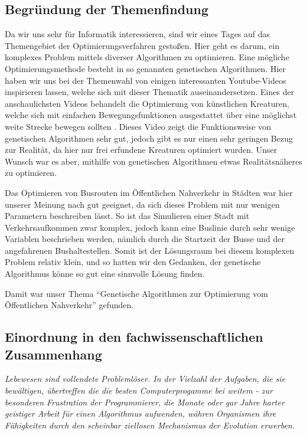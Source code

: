 \documentclass[a4paper, 11pt]{scrartcl}
\begin{document}
\subsection{Begründung der Themenfindung}
Da wir uns sehr für Informatik interessieren, sind wir eines Tages auf das Themengebiet der Optimierungsverfahren gestoßen. Hier geht es darum, ein komplexes Problem mittels diverser Algorithmen zu optimieren. Eine mögliche Optimierungsmethode besteht in so genannten genetischen Algorithmen. Hier haben wir uns bei der Themenwahl von einigen interessanten Youtube-Videos inspirieren lassen, welche sich mit dieser Thematik auseinandersetzen. Eines der anschaulichsten Videos behandelt die Optimierung von künstlichen Kreaturen, welche sich mit einfachen Bewegungsfunktionen ausgestattet über eine möglichst weite Strecke bewegen sollten \cite{carykh2015}. Dieses Video zeigt die Funktionsweise von genetischen Algorithmen sehr gut, jedoch gibt es nur einen sehr geringen Bezug zur Realität, da hier nur frei erfundene Kreaturen optimiert wurden. Unser Wunsch war es aber, mithilfe von genetischen Algorithmen etwas Realitätsnäheres zu optimieren.

Das Optimieren von Busrouten im Öffentlichen Nahverkehr in Städten war hier unserer Meinung nach gut geeignet, da sich dieses Problem mit nur wenigen Parametern beschreiben lässt. So ist das Simulieren einer Stadt mit Verkehrsaufkommen zwar komplex, jedoch kann eine Buslinie durch sehr wenige Variablen beschrieben werden, nämlich durch die Startzeit der Busse und der angefahrenen Bushaltestellen. Somit ist der Lösungsraum bei diesem komplexen Problem relativ klein, und so hatten wir den Gedanken, der genetische Algorithmus könne so gut eine sinnvolle Lösung finden.

Damit war unser Thema "`Genetische Algorithmen zur Optimierung vom Öffentlichen Nahverkehr"' gefunden.



\subsection{Einordnung in den fachwissenschaftlichen Zusammenhang}

\textit{Lebewesen sind vollendete Problemlöser. In der Vielzahl der Aufgaben, die sie bewältigen, übertreffen die die besten Computerprogamme bei weitem - zur besonderen Frustration der Programmierer, die Monate oder gar Jahre harter geistiger Arbeit für einen Algorithmus aufwenden, währen Organismen ihre Fähigkeiten durch den scheinbar ziellosen Mechanismus der Evolution erwerben.}\\
\end{document}
